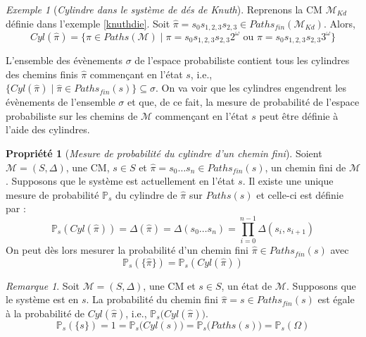 \documentclass[12pt,a4paper]{report}
\theoremstyle{definition}%
\newtheorem{propriete}{Propriété}[chapter]
\theoremstyle{remark}
\newtheorem{example}{Exemple}[chapter]
\newtheorem{remark}{Remarque}[chapter]
\newcommand{\ie}{i.e., }
\newcommand{\pr}{\mathbb{P}}
\begin{document}
\begin{example}[\textit{Cylindre dans le système de dés de Knuth}]
	Reprenons la CM $\mathcal{M}_{Kd}$ définie dans l'exemple \ref{knuthdie}. Soit $\hat{\pi} = s_0s_{1, 2, 3}s_{2, 3} \in Paths_{fin}(\mathcal{M}_{Kd})$. Alors, \[Cyl(\hat{\pi}) = \{ \pi \in Paths(\mathcal{M}) \; | \; \pi = s_0s_{1, 2, 3}s_{2, 3} 2^\omega \text{ ou } \pi = s_0s_{1, 2, 3}s_{2, 3} 3^\omega \} \]
\end{example}

L'ensemble des évènements $\sigma$ de l'espace probabiliste contient tous les
cylindres des chemins finis $\hat{\pi}$ commençant en l'état $s$, i.e.,
$\{Cyl(\hat{\pi}) \; | \; \hat{\pi} \in Paths_{fin}(s)\} \subseteq \sigma$.
On va voir que les cylindres engendrent les évènements de l'ensemble $\sigma$ et
que, de ce fait, la mesure de probabilité de l'espace probabiliste sur les chemins
de $\mathcal{M}$ commençant en l'état $s$ peut être définie à l'aide des cylindres.

\begin{propriete}[\textit{Mesure de probabilité du cylindre d'un chemin fini}]
	Soient $\mathcal{M} = (S, \Delta)$, une CM, $s \in S$ et $\hat{\pi} = s_0 \dots s_n \in Paths_{fin}(s)$, un chemin fini de $\mathcal{M}$. Supposons que le système est actuellement en l'état $s$. Il existe une unique mesure de probabilité $\pr_s$ du cylindre de $\hat{\pi}$ sur $Paths(s)$
	et celle-ci est définie par :
	\[\pr_{s}(Cyl(\hat{\pi})) = \Delta(\hat{\pi}) = \Delta(s_0 \dots s_n) = \prod_{i = 0}^{n - 1} \Delta(s_i, s_{i+1})\]
	On peut dès lors mesurer la probabilité d'un chemin fini $\hat{\pi} \in Paths_{fin}(s)$ avec
\[ \pr_s(\{\hat{\pi}\}) = \pr_s(Cyl(\hat{\pi})) \]
\end{propriete}

\begin{remark}
	Soit $\mathcal{M} = (S, \Delta)$, une CM et $s \in S$, un état de $\mathcal{M}$. Supposons que le système est en $s$. La probabilité du chemin fini $\hat{\pi} = s \in Paths_{fin}(s)$ est égale à la probabilité de $Cyl(\hat{\pi})$, \ie $\pr_s\big(Cyl(\hat{\pi})\big)$.
	\[
		\pr_s(\{s\}) = 1 = \pr_s\big(Cyl(s)\big) = \pr_s\big(Paths(s)\big) = \pr_s(\Omega)
	\]
\end{remark}
\end{document}
